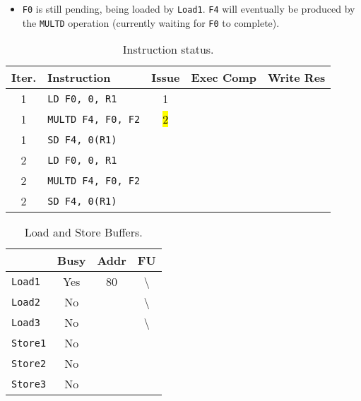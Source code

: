 \begin{enumerate}
\begin{itemize}
        \item \texttt{F0} is still pending, being loaded by \texttt{Load1}. \texttt{F4} will eventually be produced by the \texttt{MULTD} operation (currently waiting for \texttt{F0} to complete).
    \end{itemize}
    \begin{table}[!htp]
        \centering
        \begin{tabular}{@{} c l | c c c @{}}
            \toprule
            Iter.       & Instruction                   & Issue & Exec Comp & Write Res \\
            \midrule
            1           & \texttt{LD    F0, 0, R1}      & 1     &           &           \\ [.3em]
            1           & \texttt{MULTD F4, F0, F2}     & \hl{2}&           &           \\ [.3em]
            1           & \texttt{SD    F4, 0(R1)}      &       &           &           \\ [.3em]
            2           & \texttt{LD    F0, 0, R1}      &       &           &           \\ [.3em]
            2           & \texttt{MULTD F4, F0, F2}     &       &           &           \\ [.3em]
            2           & \texttt{SD    F4, 0(R1)}      &       &           &           \\
            \bottomrule
        \end{tabular}
        \caption*{Instruction status.}
    \end{table}

    \begin{table}[!htp]
        \centering
        \begin{tabular}{@{} l | c c c @{}}
            \toprule
                                & Busy      & Addr      & FU   \\
            \midrule
            \texttt{Load1}      & Yes       & 80        & \textbackslash    \\ [.3em]
            \texttt{Load2}      & No        &           & \textbackslash    \\ [.3em]
            \texttt{Load3}      & No        &           & \textbackslash    \\
            \cmidrule{1-4}
            \texttt{Store1}     & No        &           &                   \\ [.3em]
            \texttt{Store2}     & No        &           &                   \\ [.3em]
            \texttt{Store3}     & No        &           &                   \\
            \bottomrule
        \end{tabular}
        \caption*{Load and Store Buffers.}
    \end{table}


\end{enumerate}

